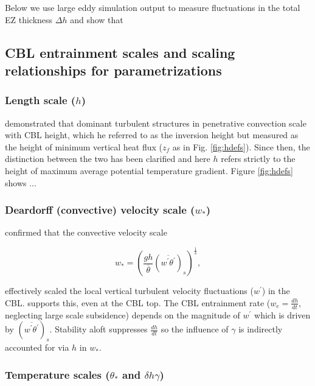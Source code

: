 \documentclass[referee]{svjour3}
\begin{document}
Below we use large eddy simulation output to measure fluctuations in the total EZ thickness $\Delta h$ and show that 

\subsection{CBL entrainment scales and scaling relationships for parametrizations}
\label{subsec:scales}
\subsubsection{Length scale ($h$)}
\label{subsubsec:}

\cite{Deardorff72} demonstrated that dominant turbulent structures in penetrative convection scale with CBL height, which he referred to as the inversion height but measured as the height of minimum vertical heat flux ($z_{f}$ as in Fig. \ref{fig:hdefs}).  Since then, the distinction between the two has been clarified \citep{SullMoengStev} and here $h$ refers strictly to the height of maximum average potential temperature gradient. Figure \ref{fig:hdefs} shows ...\\

 

\subsubsection{Deardorff (convective) velocity scale ($w_{*}$)}
\label{subsubsec:convel}

\cite{Deardorff70} confirmed that the convective velocity scale

\begin{equation}
w_{*} = \left( \frac{gh}{\overline{\theta}}(\overline{w^{'}\theta^{'}})_{s} \right)^{\frac{1}{3}},
\end{equation}


 effectively scaled the local vertical turbulent velocity fluctuations ($w^{'}$) in the CBL.  \cite{Sorbjan1} supports this, even at the CBL top.  The CBL entrainment rate ($w_{e} = \frac{dh}{dt}$, neglecting large scale subsidence) depends on the magnitude of $w^{'}$ which is driven by $(\overline{w^{'}\theta^{'}})_{s}$. Stability aloft suppresses $\frac{dh}{dt}$ so the influence of $\gamma$ is indirectly accounted for via $h$ in $w_{*}$.\\

\subsubsection{Temperature scales ($\theta_{*}$ and $\delta h \gamma$)}
\label{subsubsec:tempscales}
\end{document}
